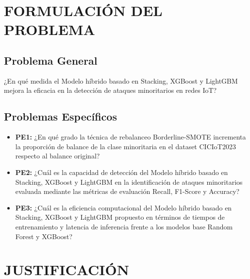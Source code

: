 \section{FORMULACIÓN DEL PROBLEMA}

\subsection{Problema General}
¿En qué medida el Modelo híbrido basado en Stacking, XGBoost y LightGBM mejora la eficacia en la detección de ataques minoritarios en redes IoT?

\subsection{Problemas Específicos}
\begin{itemize}
\item \textbf{PE1:} ¿En qué grado la técnica de rebalanceo Borderline-SMOTE incrementa la proporción de balance de la clase minoritaria en el dataset CICIoT2023 respecto al balance original?
\item \textbf{PE2:} ¿Cuál es la capacidad de detección del Modelo híbrido basado en Stacking, XGBoost y LightGBM en la identificación de ataques minoritarios evaluada mediante las métricas de evaluación Recall, F1-Score y Accuracy?
\item \textbf{PE3:} ¿Cuál es la eficiencia computacional del Modelo híbrido basado en Stacking, XGBoost y LightGBM propuesto en términos de tiempos de entrenamiento y latencia de inferencia frente a los modelos base Random Forest y XGBoost?
\end{itemize}

\section{JUSTIFICACIÓN}


